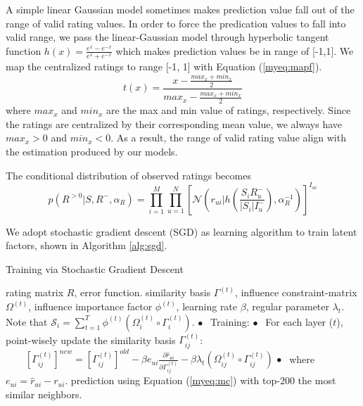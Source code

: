 \documentclass[conference]{IEEEtran}
\begin{document}
A simple linear Gaussian model sometimes makes prediction value fall out of the range of valid rating values. In order to force the predication values to fall into valid range, we pass the linear-Gaussian model through hyperbolic tangent function $h(x)= \frac{e^x-e^{-x}}{e^x+e^{-x}}$
which makes prediction values be in range of [-1,1].
We map the centralized ratings to range [-1, 1] with Equation (\ref{myeq:mapf}).
\begin{equation}\label{myeq:mapf}
t(x)= \frac{x-\frac{max_x+min_x}{2}}{max_x-\frac{max_x+min_x}{2}}
\end{equation}
where $max_x$ and $min_x$ are the max and min value of ratings, respectively. Since the ratings are centralized by their corresponding mean value, we always have $max_x>0$ and $min_x<0$. As a result, the range of valid rating value align with the estimation produced by our models.

The conditional distribution of observed ratings  becomes
\begin{equation}\label{myeq:gratetanh}
p(R^{>0}|S,R^-,\alpha_{R}) = \prod_{i=1}^{M}\prod_{u=1}^{N}[\mathcal{N}(r_{ui}|h(\frac{S_{i}R_{u}^-}{|S_{i}|I_{u}^-}), \alpha_{R}^{-1}) ]^{I_{ui}}
\end{equation}

We adopt stochastic gradient descent (SGD) as learning algorithm to train latent factors, shown in Algorithm \ref{alg:sgd}.

\begin{algorithm}[h]
   \caption{Training via Stochastic Gradient Descent}
   \label{alg:sgd}
\begin{algorithmic}
    rating matrix $R$, error function.
    similarity basis $\Gamma^{(t)}$, influence constraint-matrix $\Omega^{(t)}$, influence importance factor $\phi^{(t)}$, learning rate $\beta$, regular parameter $\lambda_{t}$. Note that $ \mathcal{S}_i =\sum_{t=1}^{T}\phi^{(t)}(\Omega^{(t)}_i \circ \Gamma^{(t)}_i)$.
   \STATE $\bullet \ \ $ Training:
   \STATE $\bullet \ \ $ For each layer ($t$), point-wisely update the similarity basis $\Gamma^{(t)}_{ij}$:
   \STATE $\quad \quad [\Gamma_{ij}^{(t)}]^{new} =[\Gamma_{ij}^{(t)}]^{old}-\beta  e_{ui} \frac{\partial \hat{r}_{ui} }{\partial \Gamma^{(t)} _{ij}}-\beta \lambda_{t}(\Omega^{(t)}_{ij} \circ \Gamma^{(t)}_{ij})$
   \STATE $\bullet \ \ $ where $e_{ui}=\hat{r}_{ui}-r_{ui}$.
   \ENDFOR
    prediction using Equation (\ref{myeq:mc}) with top-$200$ the most similar neighbors.
\end{algorithmic}
\end{algorithm}
\end{document}
